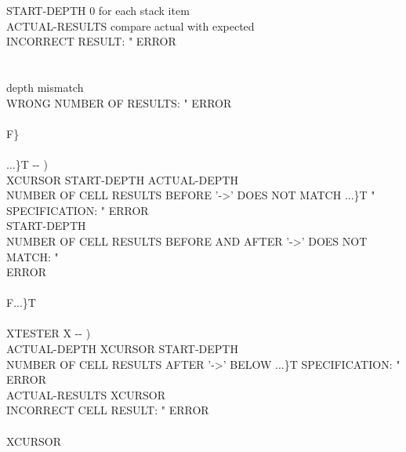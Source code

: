 \begin{tt}
\tab[3]  START-DEPTH  \word{-} 0 	\tab[1.4]	 for each stack item \\
\tab[4] ACTUAL-RESULTS   \word{+} 	\tab		{} compare actual with expected \\
\tab[4]    INCORRECT RESULT: " ERROR   \\
\tab[3]  \\
\tab[2]  \\
\tab {} \tab[16.6]	 depth mismatch \\
\tab[2]  WRONG NUMBER OF RESULTS: " ERROR \\
\tab {} \\
\tab F\} \word{;} \\
\\
\word{:} ...\}T  -{}- ) \\
\tab XCURSOR  START-DEPTH  \word{+} ACTUAL-DEPTH    \\
\tab[2]  NUMBER OF CELL RESULTS BEFORE '->' DOES NOT MATCH ...\}T " \\
\tab[2]  SPECIFICATION: " ERROR \\
\tab {}  START-DEPTH  \word{=}   \\
\tab[2]  NUMBER OF CELL RESULTS BEFORE AND AFTER '->' DOES NOT MATCH: " \\
\tab[2] ERROR \\
\tab {}  \\
\tab F...\}T \word{;} \\
\\
\word{:} XTESTER  X -{}- ) \\
\tab {}  ACTUAL-DEPTH  XCURSOR  START-DEPTH  \word{+}     \\
\tab[2]  NUMBER OF CELL RESULTS AFTER '->' BELOW ...\}T SPECIFICATION: " \\
\tab[2] ERROR  \\
\tab {} ACTUAL-RESULTS XCURSOR   \word{+}    \\
\tab[2]  INCORRECT CELL RESULT: " ERROR \\
\tab {}  \\
 XCURSOR \word{+!} \word{;} \\

\end{tt}
